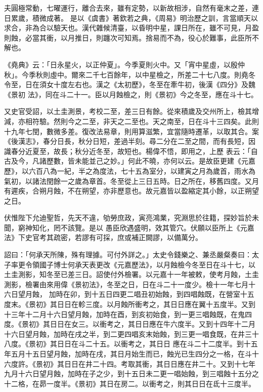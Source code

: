 \begin{pinyinscope}
 夫圓極常動，七曜運行，離合去來，雖有定勢，以新故相涉，自然有毫末之差，連日累歲，積微成著。
 是以《虞書》著欽若之典，《周易》明治歷之訓，言當順天以求合，非為合以驗天也。漢代雜候清臺，以昏明中星，課日所在，雖不可見，月盈則蝕，必當其衝，以月推日，則躔次可知焉。捨易而不為，役心於難事，此臣所不解也。



 《堯典》云：「日永星火，以正仲夏」。今季夏則火中。又「宵中星虛，以殷仲秋」。今季秋則虛中。爾來二千七百餘年，以中星檢之，所差二十七八度。則堯冬令至，日在須女十度左右也。漢之《太初歷》，冬至在牽牛初，後漢《四分》及魏《景初
 法》，同在斗二十一。臣以月蝕檢之，則《景初》今之冬至，應在斗十七。



 又史官受詔，以土圭測景，考校二至，差三日有餘。從來積歲及交州所上，檢其增減，亦相符驗。然則今之二至，非天之二至也。天之南至，日在斗十三四矣。此則十九年七閏，數微多差。復改法易章，則用算滋繁，宜當隨時遷革，以取其合。案《後漢志》，春分日長，秋分日短，差過半刻。尋二分在二至之間，而有長短，因識春分近夏至，故長；秋分近冬至，故短也。楊偉不悟，即用之，上歷
 表云：「自古及今，凡諸歷數，皆未能並己之妙。」何此不曉，亦何以云。是故臣更建《元嘉歷》，以六百八為一紀，半之為度法，七十五為室分，以建寅之月為歲首，雨水為氣初，以諸法閏餘一之歲為章首。冬至從上三日五時。日之所在，移舊四度。又月有遲疾，合朔月蝕，不在朔望，亦非歷意也。故元嘉皆以盈縮定其小餘，以正朔望之日。



 伏惟陛下允迪聖哲，先天不違，劬勞庶政，寅亮鴻業，究淵思於往籍，探妙旨於未聞，窮神知化，罔不該覽。是以
 愚臣欣遇盛明，效其管穴。伏願以臣所上《元嘉法》下史官考其疏密，若謬有可採，庶或補正闕謬，以備萬分。



 詔曰：「何承天所陳，殊有理據。可付外詳之。」太史令錢樂之、兼丞嚴粲奏曰：太子率更令領國子博士何承天表更改《元嘉歷法》，以月蝕檢今冬至日在斗十七，以土圭測影，知冬至已差三日。詔使付外檢署。以元嘉十一年被敕，使考月蝕，土圭測影，檢署由來用偉《景初法》，冬至之日，日在斗二十一度少。檢十一年七月十六日望月蝕，
 加時在卯，到十五日四更二唱丑初始蝕，到四唱蝕既，在營室十五度末。《景初》其日日在軫三度。以月蝕所衝考之，其日日應在翼十五度半。又到十三年十二月十六日望月蝕，加時在酉，到亥初始食，到一更三唱蝕既，在鬼四度。《景初》其日日在女三。以衝考之，其日日應在牛六度半。又到十四年十二月十六日望月蝕，加時在戌之半，到二更四唱亥末始蝕，到三更一唱食既，在井三十八度。《景初》其日日在斗二十五。以衝考之，其日日
 應在斗二十二度半。到十五年五月十五日望月蝕，加時在戌，其日月始生而已，蝕光已生四分之一格，在斗十六度許。《景初》其日日在井二十四。考取其衝，其日日應在井二十。又到十七年九月十六日望月蝕，加時在子之少，到十五日未二更一唱始蝕，到三唱蝕十五分之十二格，在昴一度半。《景初》其日在房二。以衝考之，則其日日在氐十三度半。




\end{pinyinscope}
